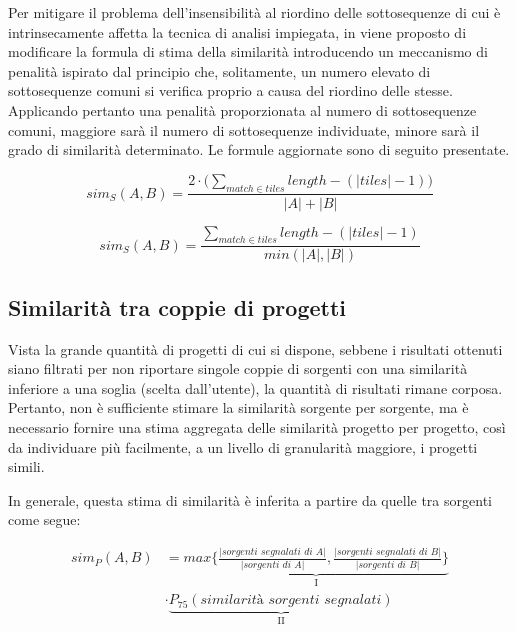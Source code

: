 Per mitigare il problema dell'insensibilità al riordino delle sottosequenze di cui è intrinsecamente affetta la tecnica di analisi impiegata, in \cite{es-plag} viene proposto di modificare la formula di stima della similarità introducendo un meccanismo di penalità ispirato dal principio che, solitamente, un numero elevato di sottosequenze comuni si verifica proprio a causa del riordino delle stesse. 
%
Applicando pertanto una penalità proporzionata al numero di sottosequenze comuni, maggiore sarà il numero di sottosequenze individuate, minore sarà il grado di similarità determinato.
%
Le formule aggiornate sono di seguito presentate.

\begin{equation}
	sim_S(A, B) = \frac{2 \cdot \bigl( \sum_{match \in tiles} length - (|tiles|-1) \bigr)}{|A|+|B|}
\end{equation}

\begin{equation}
	sim_S(A, B) = \frac{\sum_{match \in tiles} length - (|tiles|-1)}{min(|A|, |B|)}
\end{equation} 

\subsection*{Similarità tra coppie di progetti}
Vista la grande quantità di progetti di cui si dispone, sebbene i risultati ottenuti siano filtrati per non riportare singole coppie di sorgenti con una similarità inferiore a una soglia (scelta dall'utente), la quantità di risultati rimane corposa.
%
Pertanto, non è sufficiente stimare la similarità sorgente per sorgente, ma è necessario fornire una stima aggregata delle similarità progetto per progetto, così da individuare più facilmente, a un livello di granularità maggiore, i progetti simili.

In generale, questa stima di similarità è inferita a partire da quelle tra sorgenti come segue:

\begin{equation}
	\begin{split}
		sim_P(A, B) &= \underbrace{max \biggl\{ \frac{|\textit{sorgenti segnalati di A}|}{|\textit{sorgenti di A}|}, \frac{|\textit{sorgenti segnalati di B}|}{|\textit{sorgenti di B}|} \biggr\}}_\text{I} \\
		&  \cdot \underbrace{P_{75}(\textit{similarità sorgenti segnalati})}_\text{II}
	\end{split}
	\label{eq:project-similarity}
\end{equation}

